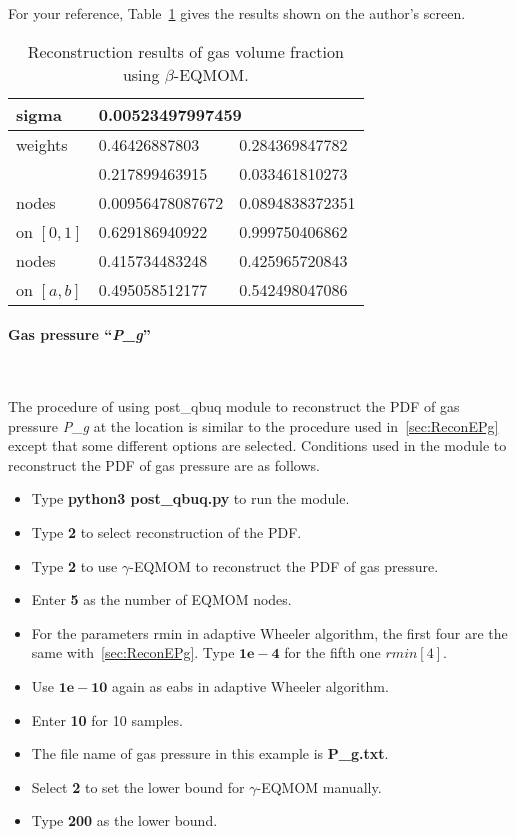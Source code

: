 \documentclass[a4paper,12pt,titlepage]{article}
\begin{document}
For your reference, Table~\ref{tab:ReconEPg} gives the results shown on the 
author's screen.

\begin{table}[htp]
 \centering
 \begin{tabular}{l|ll} \hline
  sigma       & \multicolumn{2}{l}{0.00523497997459} \\ \hline
  weights     & 0.46426887803    & 0.284369847782    \\ 
              & 0.217899463915   & 0.033461810273    \\ \hline
  nodes       & 0.00956478087672 & 0.0894838372351   \\
  on $[0, 1]$ & 0.629186940922   & 0.999750406862    \\ \hline
  nodes       & 0.415734483248   & 0.425965720843    \\ 
  on $[a, b]$ & 0.495058512177   & 0.542498047086    \\ \hline
 \end{tabular}
 \caption{Reconstruction results of gas volume fraction using $\beta$-EQMOM.}
 \label{tab:ReconEPg}
\end{table}

\paragraph{Gas pressure ``\emph{P\_g}''}\mbox{}\\
\label{sec:ReconPg}

The procedure of using post\_qbuq module to reconstruct the PDF of gas pressure
\emph{P\_g} at the location is similar to the procedure used 
in~\ref{sec:ReconEPg} except that some different options are selected.
Conditions used in the module to reconstruct the PDF of gas pressure are as
follows. 

\begin{itemize}
 \item Type \textbf{python3 post\_qbuq.py} to run the module.
 \item Type \textbf{2} to select reconstruction of the PDF.
 \item Type \textbf{2} to use $\gamma$-EQMOM to reconstruct the PDF of gas 
 pressure.
 \item Enter \textbf{5} as the number of EQMOM nodes.
 \item For the parameters rmin in adaptive Wheeler algorithm, the first four are 
 the same with~\ref{sec:ReconEPg}. Type $\mathbf{1e-4}$ for the fifth one 
 $rmin[4]$.
 \item Use $\mathbf{1e-10}$ again as eabs in adaptive Wheeler algorithm.
 \item Enter \textbf{10} for 10 samples.
 \item The file name of gas pressure in this example is \textbf{P\_g.txt}.
 \item Select \textbf{2} to set the lower bound for $\gamma$-EQMOM manually.
 \item Type \textbf{200} as the lower bound.
\end{itemize}
\end{document}
